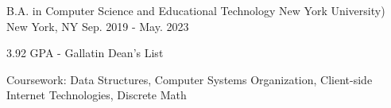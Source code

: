 

\begin{cventries}

  \cventry
    {B.A. in Computer Science and Educational Technology} %
    {New York University)} %
    {New York, NY} %
    {Sep. 2019 - May. 2023} %
    {
      \begin{cvitems} %
        \item {3.92 GPA - Gallatin Dean's List}
        \item {Coursework: Data Structures, Computer Systems Organization, Client-side Internet Technologies, Discrete Math}
      \end{cvitems}
    }

\end{cventries}
